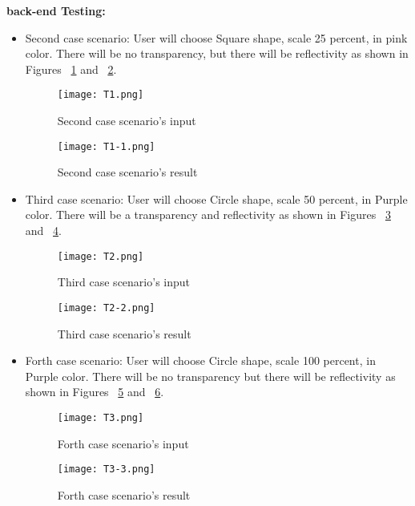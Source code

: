 \documentclass{article}
\begin{document}
\textbf{back-end Testing: } 

\newline

\begin{itemize}
    \item Second case scenario: \newline
    User will choose Square shape, scale 25 percent, in pink color. There will be no transparency, but there will be reflectivity as shown in Figures ~\ref{test2} and ~\ref{test2-2}. 
    
   \begin{figure}[H]
\centering
\texttt{[image: T1.png]}
\caption{Second case scenario's input \label{test2}}
\end{figure}

 
 \begin{figure}
    \centering
    \texttt{[image: T1-1.png]}
    \caption{Second case scenario's result}
    \label{test2-2}
\end{figure}



\item Third case scenario: \newline
User will choose Circle shape, scale 50 percent, in Purple color. There will be a transparency and reflectivity as shown in Figures ~\ref{test3} and ~\ref{test3-3}.

\begin{figure}[H]
\centering
\texttt{[image: T2.png]}
\caption{Third case scenario's input \label{test3}}
\end{figure}

\begin{figure}
    \centering
    \texttt{[image: T2-2.png]}
    \caption{Third case scenario's result}
    \label{test3-3}
\end{figure}

\item Forth case scenario: \newline
User will choose Circle shape, scale 100 percent, in Purple color. There will be no transparency but there will be reflectivity as shown in Figures ~\ref{test4} and ~\ref{test4-4}.

\begin{figure}[H]
\centering
\texttt{[image: T3.png]}
\caption{Forth case scenario's input \label{test4}}
\end{figure}

\begin{figure}
    \centering
    \texttt{[image: T3-3.png]}
    \caption{Forth case scenario's result}
    \label{test4-4}
\end{figure}


\end{itemize}
\end{document}
